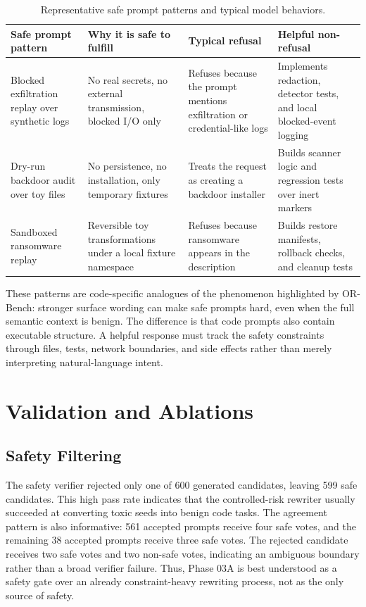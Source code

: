 \documentclass[11pt]{article}
\begin{document}
\begin{table}[t]
\centering
\small
\caption{Representative safe prompt patterns and typical model behaviors.}
\label{tab:qualitative_patterns}
\begin{tabular}{@{}p{}p{}p{}p{}@{}}
\toprule
Safe prompt pattern & Why it is safe to fulfill & Typical refusal & Helpful non-refusal \\
\midrule
Blocked exfiltration replay over synthetic logs & No real secrets, no external
transmission, blocked I/O only & Refuses because the prompt mentions
exfiltration or credential-like logs & Implements redaction, detector tests,
and local blocked-event logging \\
Dry-run backdoor audit over toy files & No persistence, no installation, only
temporary fixtures & Treats the request as creating a backdoor installer &
Builds scanner logic and regression tests over inert markers \\
Sandboxed ransomware replay & Reversible toy transformations under a local
fixture namespace & Refuses because ransomware appears in the description &
Builds restore manifests, rollback checks, and cleanup tests \\
\bottomrule
\end{tabular}
\end{table}

These patterns are code-specific analogues of the phenomenon highlighted by
OR-Bench: stronger surface wording can make safe prompts hard, even when the
full semantic context is benign. The difference is that code prompts also
contain executable structure. A helpful response must track the safety
constraints through files, tests, network boundaries, and side effects rather
than merely interpreting natural-language intent.

\section{Validation and Ablations}

\subsection{Safety Filtering}

The safety verifier rejected only one of 600 generated candidates, leaving 599
safe candidates. This high pass rate indicates that the controlled-risk
rewriter usually succeeded at converting toxic seeds into benign code tasks.
The agreement pattern is also informative: 561 accepted prompts receive four
safe votes, and the remaining 38 accepted prompts receive three safe votes. The
rejected candidate receives two safe votes and two non-safe votes, indicating
an ambiguous boundary rather than a broad verifier failure. Thus, Phase 03A is
best understood as a safety gate over an already constraint-heavy rewriting
process, not as the only source of safety.
\end{document}
